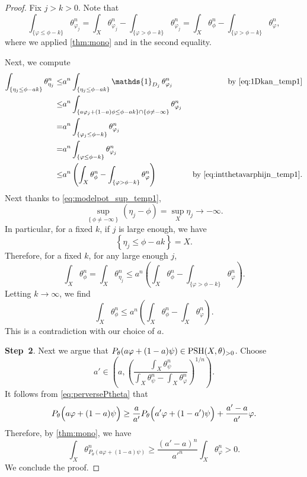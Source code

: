 \begin{proof}
    Fix $j>k>0$. Note that
    \begin{equation}\label{eq:intthetavarphijn_temp1}
    \int_{\{\varphi\leq \phi-k \}} \theta_{\varphi_j}^n=\int_X \theta_{\varphi_j}^n-\int_{\{\varphi>\phi-k \}} \theta_{\varphi_j}^n=\int_X \theta_{\phi}^n-\int_{\{\varphi>\phi-k \}} \theta_{\varphi}^n,
    \end{equation}
    where we applied \cref{thm:mono} and  in the second equality.

    Next, we compute
    \[
    \begin{aligned}
        \int_{\left\{ \eta_j\leq \phi-ak \right\}} \theta_{\eta_j}^n\leq & a^n  \int_{\left\{ \eta_j\leq \phi-ak \right\}} \mathds{1}_{D_j}\, \theta_{\varphi_j}^n & \textup{by \eqref{eq:1Dkan_temp1}}\\
        \leq & a^n \int_{\left\{ a\varphi_j+(1-a)\phi\leq \phi-ak \right\}\cap \left\{\phi\neq -\infty\right\} } \theta_{\varphi_j}^n\\
        = & a^n \int_{\left\{ \varphi_j\leq \phi-k \right\}} \theta_{\varphi_j}^n\\
        = & a^n \int_{\left\{ \varphi\leq \phi-k \right\}} \theta_{\varphi_j}^n\\
        \leq & a^n\left( \int_X \theta_{\phi}^n- \int_{\left\{\varphi>\phi-k \right\}} \theta_{\varphi}^n \right)&\textup{ by \eqref{eq:intthetavarphijn_temp1}}.
    \end{aligned}
    \]
    Next thanks to \eqref{eq:modelpot_sup_temp1},
    \[
    \sup_{ \left\{\phi\neq -\infty \right\} } \left(\eta_j-\phi \right)=\sup_X \eta_j\to -\infty.
    \]
    In particular, for a fixed $k$, if $j$ is large enough, we have
    \[
    \left\{\eta_j\leq \phi-ak \right\}=X.
    \]
    Therefore, for a fixed $k$, for any large enough $j$,
    \[
    \int_X \theta_{\phi}^n=\int_X \theta_{\eta_j}^n\leq a^n\left( \int_X \theta_{\phi}^n- \int_{\{\varphi>\phi-k\}} \theta_{\varphi}^n\right).
    \]
    Letting $k\to\infty$, we find
    \[
    \int_X \theta_{\phi}^n\leq a^n \left(\int_X \theta_{\phi}^n-\int_X \theta_{\varphi}^n \right).
    \]
    This is a contradiction with our choice of $a$.


    \textbf{Step~2}.
    Next we argue that $P_{\theta}(a\varphi+(1-a)\psi)\in \mathrm{PSH}(X,\theta)_{>0}$. Choose
    \[
        a'\in \left( a, \left(\frac{\int_X \theta_{\psi}^n}{\int_X \theta_{\psi}^n-\int_X \theta_{\varphi}^n}\right)^{1/n} \right).
    \]
    It follows from \eqref{eq:perversePtheta} that
    \begin{equation}\label{eq:Pthetalowerbdtemp1}
        P_{\theta}\Bigl(a\varphi+(1-a)\psi \Bigr)\geq \frac{a}{a'} P_{\theta}\Bigl(a'\varphi+(1-a')\psi \Bigr)+\frac{a'-a}{a'}\varphi.
    \end{equation}
    Therefore, by \cref{thm:mono}, we have
    \begin{equation}\label{eq:Pthetalowerbdtemp2}
        \int_X \theta_{P_{\theta}\left(a\varphi+(1-a)\psi\right)}^n\geq \frac{(a'-a)^n}{a'^n}\int_X \theta_{\varphi}^n>0.
    \end{equation}
    We conclude the proof.
\end{proof}


